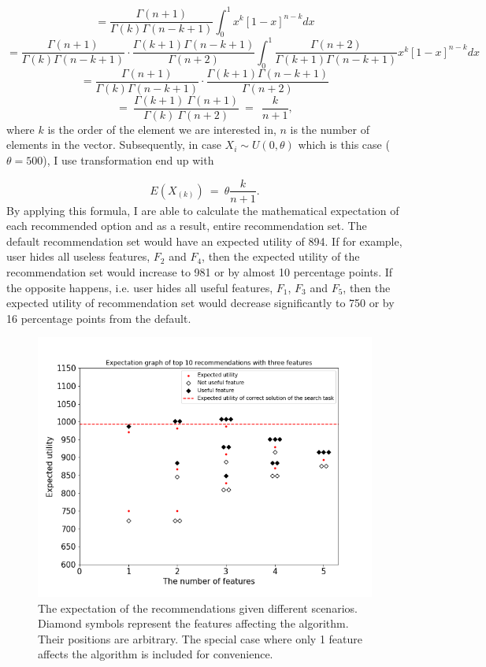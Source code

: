 \documentclass[a4paper,12pt]{article}
\begin{document}
$$
=\frac{\Gamma\left(n+1\right)}{\Gamma\left(k\right)\Gamma\left(n-k+1\right)}\int_{0}^{1}{x^k\left[1-x\right]^{n-k}}dx
$$
$$
=\frac{\Gamma\left(n+1\right)}{\Gamma\left(k\right)\Gamma\left(n-k+1\right)}\cdot\frac{\Gamma\left(k+1\right)\Gamma\left(n-k+1\right)}{\Gamma\left(n+2\right)}\int_{0}^{1}\frac{\Gamma\left(n+2\right)}{\Gamma\left(k+1\right)\Gamma\left(n-k+1\right)}x^k\left[1-x\right]^{n-k}dx
$$
$$
=\frac{\Gamma\left(n+1\right)}{\Gamma\left(k\right)\Gamma\left(n-k+1\right)}\cdot\frac{\Gamma\left(k+1\right)\Gamma\left(n-k+1\right)}{\Gamma\left(n+2\right)}
$$
$$
=\ \frac{\Gamma\left(k+1\right)\ \Gamma\left(n+1\right)}{\Gamma\left(k\right)\ \Gamma\left(n+2\right)}\ =\ \ \frac{k}{n+1} ,
$$
where $k$ is the order of the element we are interested in, $n$ is the number of elements in the vector. Subsequently, in case $X_i\sim U\left(0,\theta\right)$ which is this case ($\theta = 500$), I use transformation end up with 

$$
E\left(X_{\left(k\right)}\right)\ =\ \theta\frac{k}{n+1} .
$$
By applying this formula, I are able to calculate the mathematical expectation of each recommended option and as a result, entire recommendation set. The default recommendation set would have an expected utility of 894. If for example, user hides all useless features, $F_2$ and $F_4$, then the expected utility of the recommendation set would increase to 981 or by almost 10 percentage points. If the opposite happens, i.e. user hides all useful features, $F_1$, $F_3$ and $F_5$, then the expected utility of recommendation set would decrease significantly to 750 or by 16 percentage points from the default.

\begin{figure}
    \centering
    \includegraphics[width=0.8\linewidth]{staticFiles/ThreeFeaturesExpectationTop10SUMutility.png}
    \caption{The expectation of the recommendations given different scenarios. Diamond symbols represent the features affecting the algorithm. Their positions are arbitrary. The special case where only 1 feature affects the algorithm is included for convenience.}
    \label{fig:expectationGraph}
\end{figure}
\end{document}
